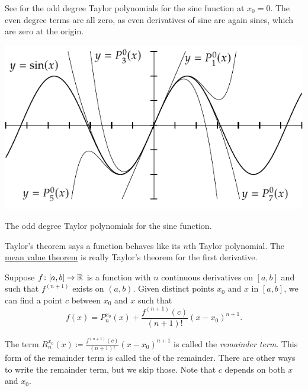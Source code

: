 See  for
the odd degree Taylor polynomials for the sine function at $x_0=0$.
The even degree terms are all zero, as even derivatives 
of sine are again sines, which are zero at the origin.
\begin{myfigureht}
\includegraphics{figures/taylorsin}
\caption{The odd degree Taylor polynomials for the sine
function.\label{fig:taylorsin}}
\end{myfigureht}

Taylor's theorem says a function behaves like its $n$th
Taylor polynomial.  The 
\hyperref[thm:mvt]{mean value theorem} is really Taylor's theorem
for the first derivative.

\begin{thm}[Taylor] \label{thm:taylor}
Suppose $f \colon [a,b] \to {\mathbb{R}}$ is a function with $n$ continuous
derivatives on $[a,b]$ and such that $f^{(n+1)}$ exists on $(a,b)$.
Given distinct points $x_0$ and $x$ in $[a,b]$,
we can find a point $c$ between $x_0$
and $x$ such that
\begin{equation*}
f(x)=P_{n}^{x_0}(x)+\frac{f^{(n+1)}(c)}{(n+1)!}{(x-x_0)}^{n+1} .
\end{equation*}
\end{thm}

The term $R_n^{x_0}(x)\coloneqq\frac{f^{(n+1)}(c)}{(n+1)!}{(x-x_0)}^{n+1}$ is called the
\emph{remainder term}.  This
form 
of the remainder term is called the
\emph{} of the remainder.  There are other ways
to write the remainder term, but we skip those.  Note that $c$ depends on
both $x$ and $x_0$.

